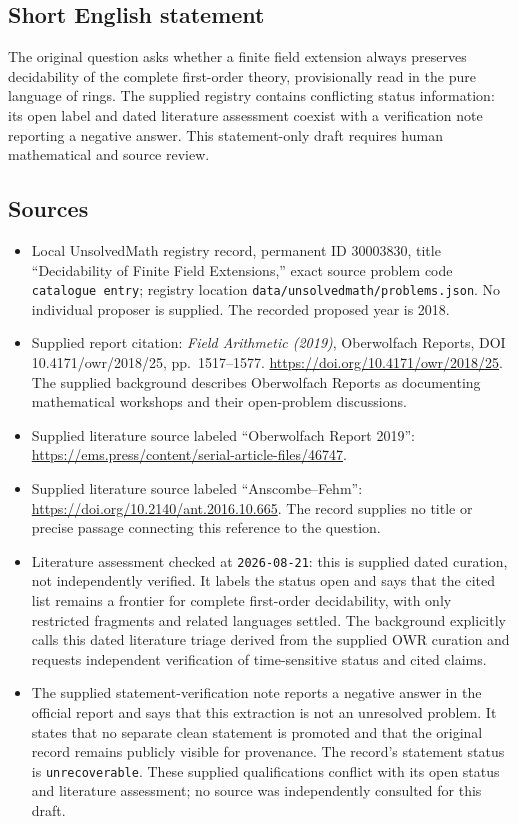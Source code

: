 \documentclass[11pt]{article}
\begin{document}
\subsection{Short English statement}
The original question asks whether a finite field extension always preserves decidability of the complete first-order theory, provisionally read in the pure language of rings. The supplied registry contains conflicting status information: its open label and dated literature assessment coexist with a verification note reporting a negative answer. This statement-only draft requires human mathematical and source review.
\subsection{Sources}
\begin{itemize}
\item Local UnsolvedMath registry record, permanent ID \(30003830\), title ``Decidability of Finite Field Extensions,'' exact source problem code \texttt{catalogue entry}; registry location \texttt{data/unsolvedmath/problems.json}. No individual proposer is supplied. The recorded proposed year is 2018.
\item Supplied report citation: \emph{Field Arithmetic (2019)}, Oberwolfach Reports, DOI 10.4171/owr/2018/25, pp.\ 1517--1577. \url{https://doi.org/10.4171/owr/2018/25}. The supplied background describes Oberwolfach Reports as documenting mathematical workshops and their open-problem discussions.
\item Supplied literature source labeled ``Oberwolfach Report 2019'': \url{https://ems.press/content/serial-article-files/46747}.
\item Supplied literature source labeled ``Anscombe--Fehm'': \url{https://doi.org/10.2140/ant.2016.10.665}. The record supplies no title or precise passage connecting this reference to the question.
\item Literature assessment checked at \texttt{2026-08-21}: this is supplied dated curation, not independently verified. It labels the status open and says that the cited list remains a frontier for complete first-order decidability, with only restricted fragments and related languages settled. The background explicitly calls this dated literature triage derived from the supplied OWR curation and requests independent verification of time-sensitive status and cited claims.
\item The supplied statement-verification note reports a negative answer in the official report and says that this extraction is not an unresolved problem. It states that no separate clean statement is promoted and that the original record remains publicly visible for provenance. The record's statement status is \texttt{unrecoverable}. These supplied qualifications conflict with its open status and literature assessment; no source was independently consulted for this draft.
\end{itemize}
\end{document}
